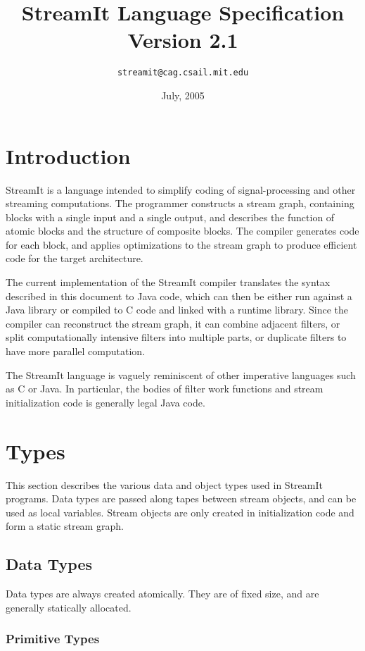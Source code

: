 \documentclass[11pt]{article}
\title{StreamIt Language Specification\\
Version 2.1}
\author{\texttt{streamit@cag.csail.mit.edu}}
\date{July, 2005}
\begin{document}
\maketitle
\tableofcontents

\section{Introduction}

StreamIt is a language intended to simplify coding of
signal-processing and other streaming computations.  The programmer
constructs a stream graph, containing blocks with a single input and a
single output, and describes the function of atomic blocks and the
structure of composite blocks.  The compiler generates code for each
block, and applies optimizations to the stream graph to produce
efficient code for the target architecture.

The current implementation of the StreamIt compiler translates the
syntax described in this document to Java code, which can then be
either run against a Java library or compiled to C code and linked
with a runtime library.  Since the compiler can reconstruct the stream
graph, it can combine adjacent filters, or split computationally
intensive filters into multiple parts, or duplicate filters to have
more parallel computation.

The StreamIt language is vaguely reminiscent of other imperative
languages such as C or Java.  In particular, the bodies of filter work
functions and stream initialization code is generally legal Java
code.

\section{Types}

This section describes the various data and object types used in
StreamIt programs.  Data types are passed along tapes between stream
objects, and can be used as local variables.  Stream objects are only
created in initialization code and form a static stream graph.

\subsection{Data Types}

Data types are always created atomically.  They are of fixed size, and
are generally statically allocated.

\subsubsection{Primitive Types}
\label{sec:primitive-types}
\end{document}
